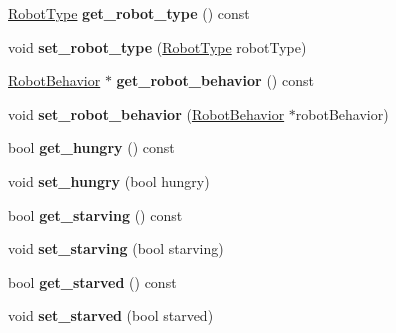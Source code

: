 \begin{DoxyCompactItemize}
\item 
\hyperlink{robot__type_8h_a78d284d08fd22d809fd436256f2cbc39}{Robot\+Type} {\bfseries get\+\_\+robot\+\_\+type} () const \hypertarget{classRobot_a3cf136e22296d3c420eb957f21662efc}{}\label{classRobot_a3cf136e22296d3c420eb957f21662efc}

\item 
void {\bfseries set\+\_\+robot\+\_\+type} (\hyperlink{robot__type_8h_a78d284d08fd22d809fd436256f2cbc39}{Robot\+Type} robot\+Type)\hypertarget{classRobot_a67f2eb521aa214a45ee5aa650898aa46}{}\label{classRobot_a67f2eb521aa214a45ee5aa650898aa46}

\item 
\hyperlink{classRobotBehavior}{Robot\+Behavior} $\ast$ {\bfseries get\+\_\+robot\+\_\+behavior} () const \hypertarget{classRobot_a5f6e19514c4829c4a7acce6504c24538}{}\label{classRobot_a5f6e19514c4829c4a7acce6504c24538}

\item 
void {\bfseries set\+\_\+robot\+\_\+behavior} (\hyperlink{classRobotBehavior}{Robot\+Behavior} $\ast$robot\+Behavior)\hypertarget{classRobot_a5d1955c04553deb31626aae8b49c59f0}{}\label{classRobot_a5d1955c04553deb31626aae8b49c59f0}

\item 
bool {\bfseries get\+\_\+hungry} () const \hypertarget{classRobot_a4f0c30fa0d822156a8ba5667ecef683e}{}\label{classRobot_a4f0c30fa0d822156a8ba5667ecef683e}

\item 
void {\bfseries set\+\_\+hungry} (bool hungry)\hypertarget{classRobot_aa7f0ec7fd205f7513198c365b928cdbf}{}\label{classRobot_aa7f0ec7fd205f7513198c365b928cdbf}

\item 
bool {\bfseries get\+\_\+starving} () const \hypertarget{classRobot_a4e5d44615bb26659cdef5e5d9b4980c2}{}\label{classRobot_a4e5d44615bb26659cdef5e5d9b4980c2}

\item 
void {\bfseries set\+\_\+starving} (bool starving)\hypertarget{classRobot_a9a265a4e223005cefd02fa9ee0ac3f62}{}\label{classRobot_a9a265a4e223005cefd02fa9ee0ac3f62}

\item 
bool {\bfseries get\+\_\+starved} () const \hypertarget{classRobot_a2124f58329b1573b2d6d663ca85cc1c5}{}\label{classRobot_a2124f58329b1573b2d6d663ca85cc1c5}

\item 
void {\bfseries set\+\_\+starved} (bool starved)\hypertarget{classRobot_a363b48fd2e0d48696b6ec9b9e76a4761}{}\label{classRobot_a363b48fd2e0d48696b6ec9b9e76a4761}

\end{DoxyCompactItemize}
